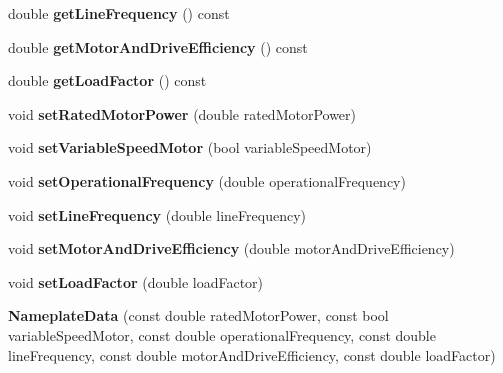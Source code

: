 \begin{DoxyCompactItemize}
double {\bfseries get\+Line\+Frequency} () const
\item 
\mbox{\label{class_nameplate_data_ab067dcdcd77bb824a4f7d406c35165b5}} 
double {\bfseries get\+Motor\+And\+Drive\+Efficiency} () const
\item 
\mbox{\label{class_nameplate_data_aa0e7f69bd390f0f763d0de71dde08c1b}} 
double {\bfseries get\+Load\+Factor} () const
\item 
\mbox{\label{class_nameplate_data_a75169688de937aa3cfc6b4720ffd012a}} 
void {\bfseries set\+Rated\+Motor\+Power} (double rated\+Motor\+Power)
\item 
\mbox{\label{class_nameplate_data_a684e1e8c9bf292a48facfd049ec0b312}} 
void {\bfseries set\+Variable\+Speed\+Motor} (bool variable\+Speed\+Motor)
\item 
\mbox{\label{class_nameplate_data_a462452ba8a3a49ffc711a97e9b75b66e}} 
void {\bfseries set\+Operational\+Frequency} (double operational\+Frequency)
\item 
\mbox{\label{class_nameplate_data_a44efac29acafa1d2598d20774807a54a}} 
void {\bfseries set\+Line\+Frequency} (double line\+Frequency)
\item 
\mbox{\label{class_nameplate_data_afbd08acd9803c61a7b6cc819ac20e65f}} 
void {\bfseries set\+Motor\+And\+Drive\+Efficiency} (double motor\+And\+Drive\+Efficiency)
\item 
\mbox{\label{class_nameplate_data_a069c14ca1d86d30261c041f8483ed924}} 
void {\bfseries set\+Load\+Factor} (double load\+Factor)
\item 
\mbox{\label{class_nameplate_data_a6958626d3d824cdffb7080c13f5bf1e6}} 
{\bfseries Nameplate\+Data} (const double rated\+Motor\+Power, const bool variable\+Speed\+Motor, const double operational\+Frequency, const double line\+Frequency, const double motor\+And\+Drive\+Efficiency, const double load\+Factor)
\item 
\mbox{\label{class_nameplate_data_a3506a38071eefa609103cd459c187423}} 

\end{DoxyCompactItemize}
